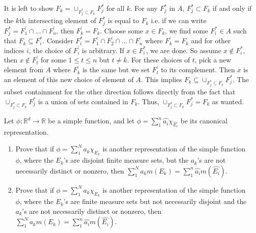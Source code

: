 \documentclass[12pt]{article}
\newcommand{\R}{\mathbb{R}}
\newenvironment{solution}[2][Solution]{\begin{trivlist}
\item[\hskip \labelsep {\bfseries #1}]}{\end{trivlist}}
\newenvironment{problem}[2][Problem]{\begin{trivlist}
\item[\hskip \labelsep {\bfseries #1}\hskip \labelsep {\bfseries #2.}]}{\end{trivlist}}
\begin{document}
\begin{solution}{}
    It is left to show $F_k = \cup_{F_j^{*}\subset F_k} F_j^{*}$ for all $k$. For any $F_j^{*}$ in $A$, $F_j^{*}\subset F_k$
    if and only if the $k$th intersecting element of $F_j^{*}$ is equal to $F_k$ i.e. if we can write
    $F_j^{*} = F_1^{'} \cap \hdots \cap F_n^{'}$, then $F_k^{'} = F_k$. Choose some $x\in F_k$, we find some $F_i^*\in A$ such that
    $F_k\subseteq F_i^{*}$. Consider 
    $F_i^{*} = F_1^{'} \cap F_2^{'} \cap \hdots \cap F_n^{'}$ 
    where $F_k^{'} = F_k$ and for other indices $i$,
    the choice of $F_i^{'}$ is arbitrary. If $x\in F_i^{*}$, we are done. So assume $x\not\in F_i^{*}$, then $x\not\in F_t^{'}$ for some
    $1\leq t\leq n$ but $t\neq k$. For these choices of $t$, pick a new element from $A$ where $F_k^{'}$ is the same but
    we set $F_t^{'}$ to its complement. Then $x$ is an element of this new choice of element of $A$. This implies 
    $F_k\subseteq\cup_{F_j^*\subset F_k} F_j^*$. The subset containment for the other direction follows directly from the
    fact that $\cup_{F_j^*\subset F_k} F_j^*$ is a union of sets contained in $F_k$. Thus, $\cup_{F_j^*\subset F_k} F_j^* = F_k$
    as wanted.
\end{solution}

\begin{problem}{2}

    Let $\phi:\R^d\to\R$ be a simple function, and let $\phi = \sum_1^n \hat{a_i}\chi_{\hat{E_i}}$ be its canonical
    representation.
    
    \begin{enumerate}
        \item Prove that if $\phi = \sum_1^N a_k\chi_{E_k}$ is another representation of the simple function $\phi$, where
        the $E_k$'s are disjoint finite measure sets, but the $a_k$'s are not necessarily distinct or nonzero, then
        $\sum_1^N a_km(E_k) = \sum_1^n \hat{a_i}m(\hat{E_i})$.
        
        \item Prove that if $\phi = \sum_1^N a_k\chi_{E_k}$ is another representation of the simple function $\phi$, where
        the $E_k$'s are finite measure sets but not necessarily disjoint and the $a_k$'s are not necessarily distinct or
        nonzero, then $\sum_1^N a_km(E_k) = \sum_1^n \hat{a_i}m(\hat{E_i})$. 
    \end{enumerate}
\end{problem}
\end{document}
